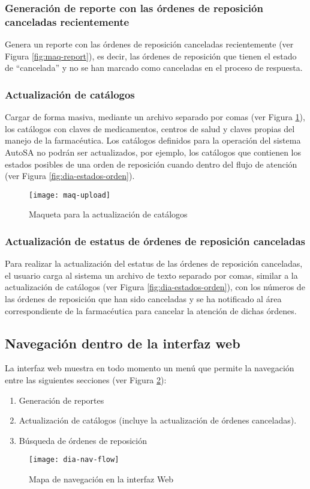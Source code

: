 \subsubsection{Generación de reporte con las órdenes de reposición canceladas recientemente}
Genera un reporte con las órdenes de reposición canceladas recientemente (ver Figura \ref{fig:maq-report}), es decir, las órdenes de reposición que tienen el estado de “cancelada” y no se han marcado como canceladas en el proceso de respuesta.

\subsubsection{Actualización de catálogos}
Cargar de forma masiva, mediante un archivo separado por comas (ver Figura \ref{fig:maq-upload}), los catálogos con claves de medicamentos, centros de salud y claves propias del manejo de la farmacéutica. Los catálogos definidos para la operación del sistema AutoSA no podrán ser actualizados, por ejemplo, los catálogos que contienen los estados posibles de una orden de reposición cuando dentro del flujo de atención (ver Figura \ref{fig:dia-estados-orden}).
\begin{figure}[h]
  \centering
  \texttt{[image: maq-upload]}
  \caption{Maqueta para la actualización de catálogos}
  \label{fig:maq-upload}
\end{figure}

\subsubsection{Actualización de estatus de órdenes de reposición canceladas}
Para realizar la actualización del estatus de las órdenes de reposición canceladas, el usuario carga al sistema un archivo de texto separado por comas, similar a la actualización de catálogos (ver Figura \ref{fig:dia-estados-orden}), con los números de las órdenes de reposición que han sido canceladas y se ha notificado al área correspondiente de la farmacéutica para cancelar la atención de dichas órdenes.

\subsection{Navegación dentro de la interfaz web}
La interfaz web muestra en todo momento un menú que permite la navegación entre las siguientes secciones (ver Figura \ref{fig:dia-nav-flow}):
\begin{enumerate}
  \item Generación de reportes
  \item Actualización de catálogos (incluye la actualización de órdenes canceladas).
  \item Búsqueda de órdenes de reposición
\end{enumerate}
\begin{figure}[h]
  \centering
  \texttt{[image: dia-nav-flow]}
  \caption{Mapa de navegación en la interfaz Web}
  \label{fig:dia-nav-flow}
\end{figure}


